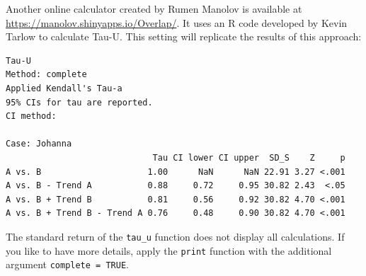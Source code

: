\documentclass[
  letterpaper,
  DIV=11,
  numbers=noendperiod]{scrreprt}
\newenvironment{Shaded}{\begin{snugshade}}{\end{snugshade}}
\newcommand{\AttributeTok}[1]{\textcolor[rgb]{0.40,0.45,0.13}{#1}}
\newcommand{\ConstantTok}[1]{\textcolor[rgb]{0.56,0.35,0.01}{#1}}
\newcommand{\FunctionTok}[1]{\textcolor[rgb]{0.28,0.35,0.67}{#1}}
\newcommand{\NormalTok}[1]{\textcolor[rgb]{0.00,0.23,0.31}{#1}}
\newcommand{\SpecialCharTok}[1]{\textcolor[rgb]{0.37,0.37,0.37}{#1}}
\newcommand{\StringTok}[1]{\textcolor[rgb]{0.13,0.47,0.30}{#1}}
\begin{document}
Another online calculator created by Rumen Manolov is available at
\url{https://manolov.shinyapps.io/Overlap/}. It uses an R code developed
by Kevin Tarlow to calculate Tau-U. This setting will replicate the
results of this approach:

\begin{Shaded}
\end{Shaded}

\begin{verbatim}
Tau-U
Method: complete 
Applied Kendall's Tau-a
95% CIs for tau are reported.
CI method: 

Case: Johanna 
                             Tau CI lower CI upper  SD_S    Z     p
A vs. B                     1.00      NaN      NaN 22.91 3.27 <.001
A vs. B - Trend A           0.88     0.72     0.95 30.82 2.43  <.05
A vs. B + Trend B           0.81     0.56     0.92 30.82 4.70 <.001
A vs. B + Trend B - Trend A 0.76     0.48     0.90 30.82 4.70 <.001
\end{verbatim}

The standard return of the \texttt{tau\_u} function does not display all
calculations. If you like to have more details, apply the \texttt{print}
function with the additional argument \texttt{complete\ =\ TRUE}.

\begin{Shaded}
\end{Shaded}
\end{document}
